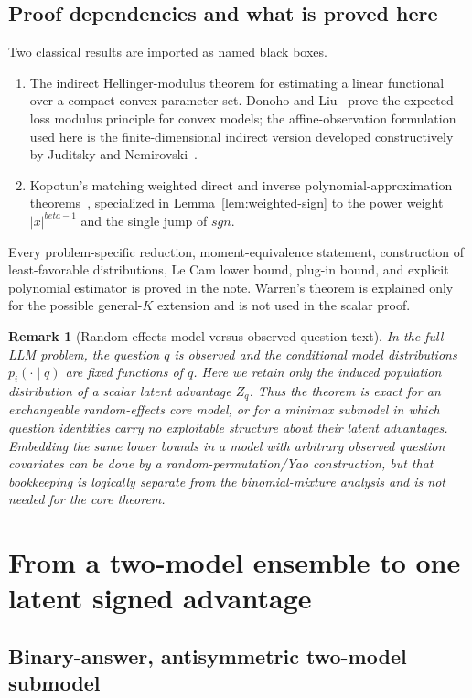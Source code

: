\documentclass[11pt]{article}
\def\beta{beta}%
\def\sgn{sgn}%
\newtheorem{remark}[theorem]{Remark}
\newcommand{\sgn}{\operatorname{sgn}}
\begin{document}
\subsection*{Proof dependencies and what is proved here}
Two classical results are imported as named black boxes.
\begin{enumerate}[label=(D\arabic*)]
\item The indirect Hellinger-modulus theorem for estimating a linear functional over a compact convex parameter set.  Donoho and Liu~\cite{DonohoLiuII} prove the expected-loss modulus principle for convex models; the affine-observation formulation used here is the finite-dimensional indirect version developed constructively by Juditsky and Nemirovski~\cite{JuditskyNemirovski}.
\item Kopotun's matching weighted direct and inverse polynomial-approximation theorems~\cite{Kopotun}, specialized in Lemma~\ref{lem:weighted-sign} to the power weight $|x|^{\beta-1}$ and the single jump of $\sgn$.
\end{enumerate}
Every problem-specific reduction, moment-equivalence statement, construction of least-favorable distributions, Le Cam lower bound, plug-in bound, and explicit polynomial estimator is proved in the note.  Warren's theorem is explained only for the possible general-$K$ extension and is not used in the scalar proof.

\begin{remark}[Random-effects model versus observed question text]
In the full LLM problem, the question $q$ is observed and the conditional model distributions $p_i(\cdot\mid q)$ are fixed functions of $q$.  Here we retain only the induced population distribution of a scalar latent advantage $Z_q$.  Thus the theorem is exact for an exchangeable random-effects core model, or for a minimax submodel in which question identities carry no exploitable structure about their latent advantages.  Embedding the same lower bounds in a model with arbitrary observed question covariates can be done by a random-permutation/Yao construction, but that bookkeeping is logically separate from the binomial-mixture analysis and is not needed for the core theorem.
\end{remark}

\section{From a two-model ensemble to one latent signed advantage}

\subsection{Binary-answer, antisymmetric two-model submodel}
\end{document}
